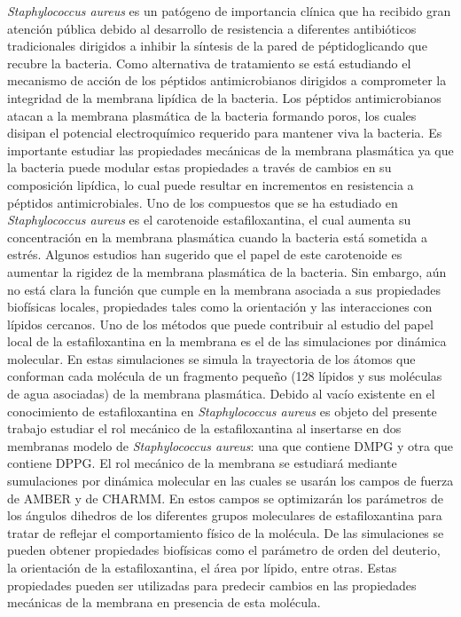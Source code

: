 \textit{Staphylococcus aureus} es un patógeno de importancia clínica que ha recibido gran atención pública debido al desarrollo de resistencia a diferentes antibióticos tradicionales dirigidos a inhibir la síntesis de la pared de péptidoglicando que recubre la bacteria. Como alternativa de tratamiento se está estudiando el mecanismo de acción de los péptidos antimicrobianos dirigidos a comprometer la integridad de la membrana lipídica de la bacteria. Los péptidos antimicrobianos atacan a la membrana plasmática de la bacteria formando poros, los cuales disipan el potencial electroquímico requerido para mantener viva la bacteria. Es importante estudiar las propiedades mecánicas de la membrana plasmática ya que la bacteria puede modular estas propiedades a través de cambios en su composición lipídica, lo cual puede resultar en incrementos en resistencia a péptidos antimicrobiales. Uno de los compuestos que se ha estudiado en \textit{Staphylococcus aureus} es  el carotenoide estafiloxantina, el cual aumenta  su concentración en la membrana plasmática cuando la bacteria está sometida a estrés. Algunos estudios han sugerido que el papel de este carotenoide es aumentar la rigidez de la membrana plasmática de la bacteria. Sin embargo, aún no está clara la función que cumple en la membrana asociada a sus propiedades biofísicas locales, propiedades tales como la orientación y las interacciones con lípidos cercanos. Uno de los métodos que puede contribuir al estudio del papel local de la estafiloxantina en la membrana es el de las simulaciones por dinámica molecular. En estas simulaciones se simula la trayectoria de los átomos que conforman cada molécula de un fragmento pequeño (128 lípidos y sus moléculas de agua asociadas) de la membrana plasmática.
Debido al vacío existente en el conocimiento de estafiloxantina en \textit{Staphylococcus aureus} es objeto del presente trabajo estudiar el rol mecánico de la estafiloxantina al insertarse en dos membranas modelo de \textit{Staphylococcus aureus}: una que contiene DMPG y otra que contiene DPPG. El rol mecánico de la membrana se estudiará mediante sumulaciones por dinámica molecular en las cuales se usarán los campos de fuerza de AMBER y de CHARMM. En estos campos se optimizarán los parámetros de los ángulos dihedros de los diferentes grupos moleculares de estafiloxantina para tratar de reflejar el comportamiento físico de la molécula. De las simulaciones se pueden obtener propiedades biofísicas como el parámetro de orden del deuterio, la orientación de la estafiloxantina, el área por lípido, entre otras. Estas propiedades pueden ser utilizadas para predecir cambios en las propiedades mecánicas de la membrana en presencia de esta molécula.
